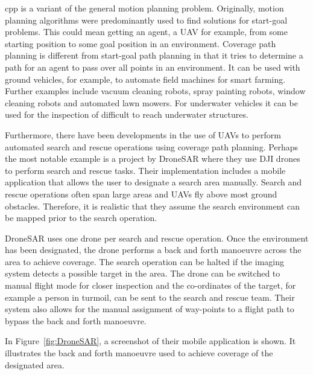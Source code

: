 \ac{cpp} is a variant of the general motion planning problem. Originally, motion planning algorithms were predominantly used to find solutions for start-goal problems\cite{Choset2001}. This could mean getting an agent, a UAV for example, from some starting position to some goal position in an environment\cite{Lynch2017}. Coverage path planning is different from start-goal path planning in that it tries to determine a path for an agent to pass over all points in an environment\cite{Choset2001}. It can be used with ground vehicles, for example, to automate field machines for smart farming\cite{Hameed2014}. Further examples include vacuum cleaning robots, spray painting robots\cite{Atkar2005}, window cleaning robots\cite{Mir-Nasiri2018} and automated lawn mowers\cite{Arkin1999}. For underwater vehicles it can be used for the inspection of difficult to reach underwater structures\cite{Englot2012}. 

Furthermore, there have been developments in the use of UAVs to perform automated search and rescue operations using coverage path planning. Perhaps the most notable example is a project by DroneSAR where they use DJI drones to perform search and rescue tasks. Their implementation includes a mobile application that allows the user to designate a search area manually\cite{DroneSAR01}. Search and rescue operations often span large areas and UAVs fly above most ground obstacles. Therefore, it is realistic that they assume the search environment can be mapped prior to the search operation\cite{CPP-Survey-2013}.

DroneSAR uses one drone per search and rescue operation. Once the environment has been designated, the drone performs a back and forth manoeuvre across the area to achieve coverage. The search operation can be halted if the imaging system detects a possible target in the area. The drone can be switched to manual flight mode for closer inspection and the co-ordinates of the target, for example a person in turmoil, can be sent to the search and rescue team. Their system also allows for the manual assignment of way-points to a flight path to bypass the back and forth manoeuvre.\cite{DroneSAR02}

In Figure~\ref{fig:DroneSAR}, a screenshot of their mobile application is shown. It illustrates the back and forth manoeuvre used to achieve coverage of the designated area.


